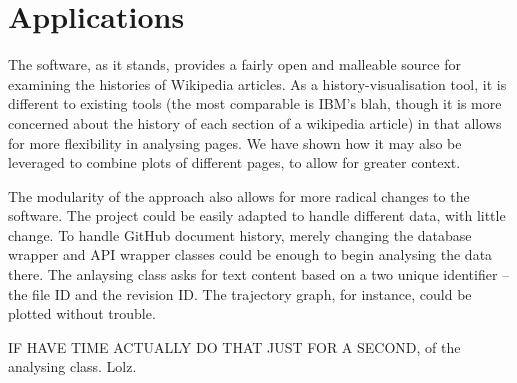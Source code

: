 \section{Applications}
The software, as it stands, provides a fairly open and malleable
source for examining the histories of Wikipedia articles. As a
history-visualisation tool, it is different to existing tools (the
most comparable is IBM's blah, though it is more concerned about the
history of each section of a wikipedia article) in that allows for
more flexibility in analysing pages. We have shown how it may also be
leveraged to combine plots of different pages, to allow for greater
context.

The modularity of the approach also allows for more radical changes to
the software. The project could be easily adapted to handle different
data, with little change. To handle GitHub document history, merely
changing the database wrapper and API wrapper classes could be enough
to begin analysing the data there. The anlaysing class asks for text
content based on a two unique identifier -- the file ID and the
revision ID. The trajectory graph, for instance, could be plotted
without trouble.

IF HAVE TIME ACTUALLY DO THAT JUST FOR A SECOND, of the analysing
class. Lolz.

